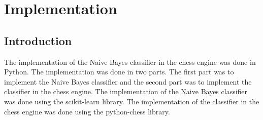 \chapter{Implementation}


\section{Introduction}
The implementation of the Naive Bayes classifier in the chess engine was done in Python. The implementation was done in two parts. The first part was to implement the Naive Bayes classifier and the second part was to implement the classifier in the chess engine. The implementation of the Naive Bayes classifier was done using the scikit-learn library. The implementation of the classifier in the chess engine was done using the python-chess library.
 


